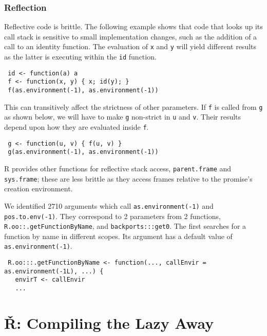 \documentclass[review,nonacm,screen,acmsmall,anonymous=true]{acmart}
\newcommand{\code}[1]{\lstinline |#1|\xspace}
\renewcommand{\c}[1]{\lstinline |#1|\xspace}
\renewcommand{\Rsh}{{\sf\v R}\xspace}
\begin{document}
\subsubsection{Reflection}
Reflective code is brittle. The following example shows that code that looks up
its call stack is sensitive to small implementation changes, such as the
addition of a call to an identity function. The evaluation of \c x and \c y will
yield different results as the latter is executing within the \c{id} function.
%
\begin{lstlisting}
 id <- function(a) a
 f <- function(x, y) { x; id(y); }
 f(as.environment(-1), as.environment(-1))
\end{lstlisting}
%
\noindent
This can transitively affect the strictness of other parameters. If \code{f} is
called from \code{g} as shown below, we will have to make \code{g} non-strict in
\code{u} and \code{v}. Their results depend upon how they are evaluated inside
\code{f}.

\begin{lstlisting}
 g <- function(u, v) { f(u, v) }
 g(as.environment(-1), as.environment(-1))
\end{lstlisting}
%
\noindent
R provides other functions for reflective stack access, \code{parent.frame} and
\code{sys.frame}; these are less brittle as they access frames relative to the
promise's creation environment.

We identified 2710 arguments which call \code{as.environment(-1)} and
\code{pos.to.env(-1)}. They correspond to 2 parameters from 2 functions,
\code{R.oo::.getFunctionByName}, and \code{backports:::get0}.
%
The first searches for a function by name in different scopes. Its argument has
a default value of \code{as.environment(-1)}.
%
\begin{lstlisting}
 R.oo:::.getFunctionByName <- function(..., callEnvir = as.environment(-1L), ...) {
   envirT <- callEnvir
   ...
\end{lstlisting}
%

\section{\Rsh: Compiling the Lazy Away}\label{sec:rsh}
\end{document}
